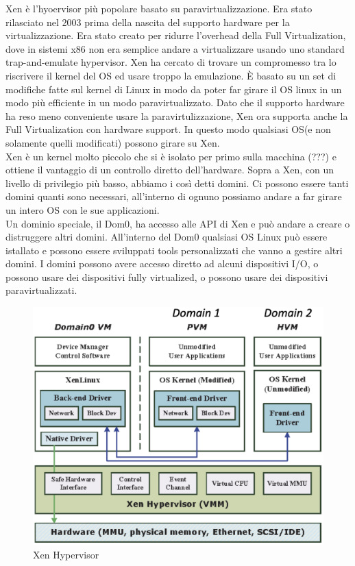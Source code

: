 \documentclass{article}
\begin{document}
Xen è l'hyoervisor più popolare basato su paravirtualizzazione. Era stato rilasciato nel 2003 prima della nascita del supporto hardware per la virtualizzazione. Era stato creato per ridurre l'overhead della Full Virtualization, dove in sistemi x86 non era semplice andare a virtualizzare usando uno standard trap-and-emulate hypervisor. Xen ha cercato di trovare un compromesso tra lo riscrivere il kernel del OS ed usare troppo la emulazione. È basato su un set di modifiche fatte sul kernel di Linux in modo da poter far girare il OS linux in un modo più efficiente in un modo paravirtualizzato. Dato che il supporto hardware ha reso meno conveniente usare la paravirtulizzazione, Xen ora supporta anche la Full Virtualization con hardware support. In questo modo qualsiasi OS(e non solamente quelli modificati) possono girare su Xen.\\
Xen è un kernel molto piccolo che si è isolato per primo sulla macchina (???) e ottiene il vantaggio di un controllo diretto dell'hardware. Sopra a Xen, con un livello di privilegio più basso, abbiamo i così detti domini. Ci possono essere tanti domini quanti sono necessari, all'interno di ognuno possiamo andare a far girare un intero OS con le sue applicazioni.\\
Un dominio speciale, il Dom0, ha accesso alle API di Xen e può andare a creare o distruggere altri domini. All'interno del Dom0 qualsiasi OS Linux può essere istallato e possono essere sviluppati tools personalizzati che vanno a gestire altri domini. I domini possono avere accesso diretto ad alcuni dispositivi I/O, o possono usare dei dispositivi fully virtualized, o possono usare dei dispositivi paravirtualizzati.
\begin{figure}[H]
    \centering
    \includegraphics[scale=0.4]{img/Virt_tech/19.png}
    \caption{Xen Hypervisor}
\end{figure}
\end{document}
